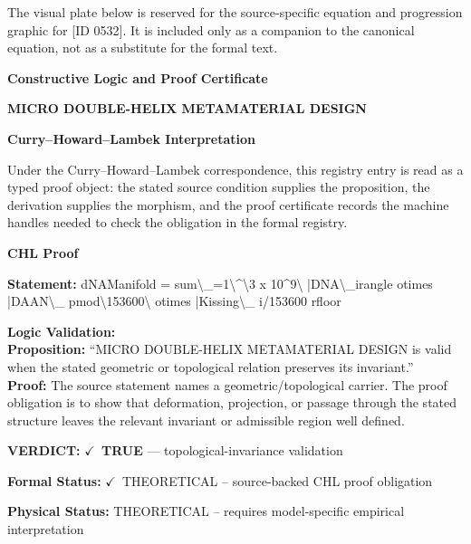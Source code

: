 \begingroup\footnotesize\sloppy
The visual plate below is reserved for the source-specific equation and progression graphic for [ID 0532]. It is included only as a companion to the canonical equation, not as a substitute for the formal text.
\par\endgroup
\ifTZPDarkEdition
{}
\fi

\clearpage
\begingroup\tzpsupportsetup
\noindent\textbf{\fontsize{10.8pt}{12.8pt}\selectfont [ID 0532] Constructive Logic and Proof Certificate}\par
\noindent\textbf{\fontsize{10pt}{12pt}\selectfont MICRO DOUBLE-HELIX METAMATERIAL DESIGN}\par
\vspace{0.45em}
\begingroup
\footnotesize
\setlength{\parskip}{0.22em}
\setlength{\parindent}{0pt}
\noindent\textbf{Curry--Howard--Lambek Interpretation}\par
Under the Curry--Howard--Lambek correspondence, this registry entry is read as a typed proof
object: the stated source condition supplies the proposition, the derivation supplies the
morphism, and the proof certificate records the machine handles needed to check the obligation
in the formal registry.

\vspace{0.45em}
\noindent\textbf{CHL Proof}\par
\textbf{Statement:} dNAManifold = sum\textbackslash{}\_=1\textbackslash{}\textasciicircum{}\textbackslash{}3 x 10\textasciicircum{}9\textbackslash{} |DNA\textbackslash{}\_irangle otimes |DAAN\textbackslash{}\_ pmod\textbackslash{}153600\textbackslash{} otimes
|Kissing\textbackslash{}\_ i/153600 rfloor

\textbf{Logic Validation:}\\
\textbf{Proposition:} ``MICRO DOUBLE-HELIX METAMATERIAL DESIGN is valid when the stated geometric or topological
relation preserves its invariant.''\\
\textbf{Proof:} The source statement names a geometric/topological carrier. The proof obligation is to
show that deformation, projection, or passage through the stated structure leaves the
relevant invariant or admissible region well defined.

\textbf{VERDICT:} \ensuremath{\checkmark}\ \textbf{TRUE} --- topological-invariance validation

\textbf{Formal Status:} \ensuremath{\checkmark}\ THEORETICAL -- source-backed CHL proof obligation

\textbf{Physical Status:} THEORETICAL -- requires model-specific empirical interpretation
\par\vspace{0.45em}
\par
\ifTZPDarkEdition
{}
\fi
\endgroup
\endgroup
